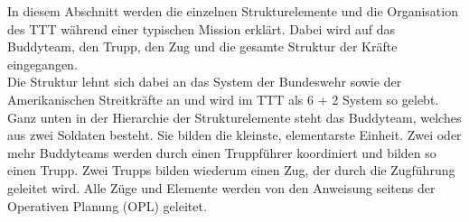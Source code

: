 In diesem Abschnitt werden die einzelnen Strukturelemente und die Organisation des \ac{TTT} während einer typischen Mission erklärt. Dabei wird auf das Buddyteam, den Trupp, den Zug und die gesamte Struktur der Kräfte eingegangen.\\
Die Struktur lehnt sich dabei an das System der Bundeswehr sowie der Amerikanischen Streitkräfte an und wird im \ac{TTT} als 6 + 2 System so gelebt.\\
Ganz unten in der Hierarchie der Strukturelemente steht das Buddyteam, welches aus zwei Soldaten besteht. Sie bilden die kleinste, elementarste Einheit. Zwei oder mehr Buddyteams werden durch einen Truppführer koordiniert und bilden so einen Trupp. Zwei Trupps bilden wiederum einen Zug, der durch die Zugführung geleitet wird. Alle Züge und Elemente werden von den Anweisung seitens der Operativen Planung (\ac{OPL}) geleitet.  










